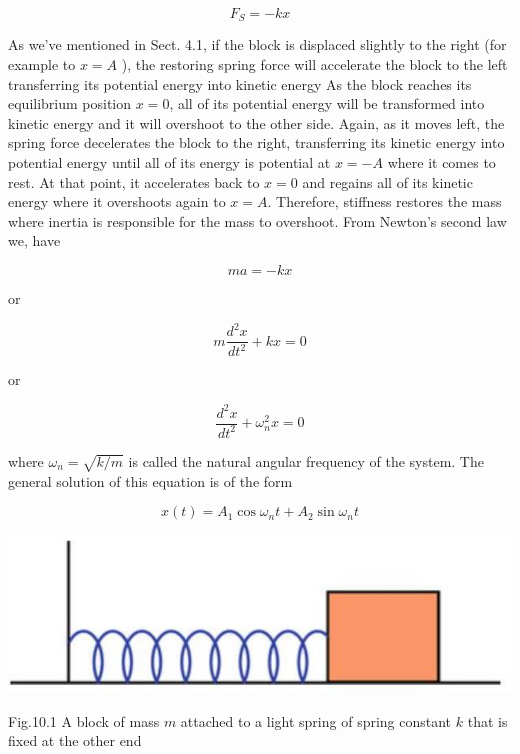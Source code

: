 \documentclass[10pt]{article}
\begin{document}
$$
F_{S}=-k x
$$

As we've mentioned in Sect. 4.1, if the block is displaced slightly to the right (for example to $x=A$ ), the restoring spring force will accelerate the block to the left transferring its potential energy into kinetic energy As the block reaches its equilibrium position $x=0$, all of its potential energy will be transformed into kinetic energy and it will overshoot to the other side. Again, as it moves left, the spring force decelerates the block to the right, transferring its kinetic energy into potential energy until all of its energy is potential at $x=-A$ where it comes to rest. At that point, it accelerates back to $x=0$ and regains all of its kinetic energy where it overshoots again to $x=A$. Therefore, stiffness restores the mass where inertia is responsible for the mass to overshoot. From Newton's second law we, have

$$
m a=-k x
$$

or

$$
m \frac{d^{2} x}{d t^{2}}+k x=0
$$

or


\begin{equation*}
\frac{d^{2} x}{d t^{2}}+\omega_{n}^{2} x=0 \tag{10.1}
\end{equation*}


where $\omega_{n}=\sqrt{k / m}$ is called the natural angular frequency of the system. The general solution of this equation is of the form


\begin{equation*}
x(t)=A_{1} \cos \omega_{n} t+A_{2} \sin \omega_{n} t \tag{10.2}
\end{equation*}


\begin{center}
\includegraphics[max width=\textwidth]{2024_09_13_db1f357d2aad0a03eb2eg-163(1)}
\end{center}

Fig.10.1 A block of mass $m$ attached to a light spring of spring constant $k$ that is fixed at the other end
\end{document}
